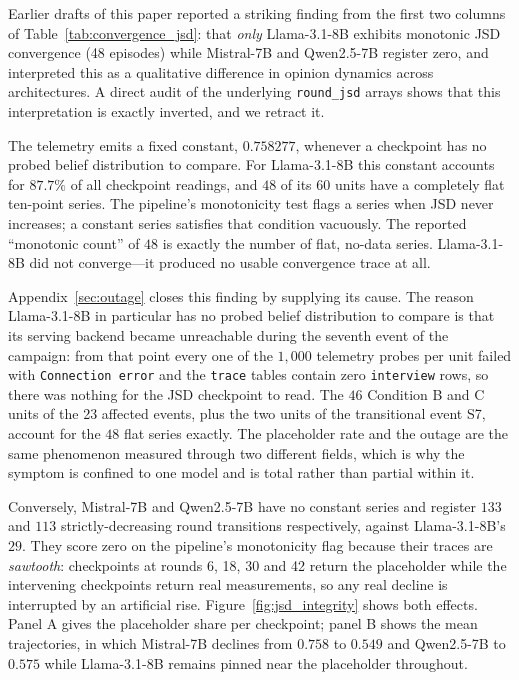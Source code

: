 \documentclass[11pt,journal,onecolumn]{IEEEtran}
\begin{document}
Earlier drafts of this paper reported a striking finding from the first two columns of Table~\ref{tab:convergence_jsd}: that \emph{only} Llama-3.1-8B exhibits monotonic JSD convergence (48 episodes) while Mistral-7B and Qwen2.5-7B register zero, and interpreted this as a qualitative difference in opinion dynamics across architectures. A direct audit of the underlying \texttt{round\_jsd} arrays shows that this interpretation is exactly inverted, and we retract it.

The telemetry emits a fixed constant, $0.758277$, whenever a checkpoint has no probed belief distribution to compare. For Llama-3.1-8B this constant accounts for $87.7\%$ of all checkpoint readings, and $48$ of its $60$ units have a completely flat ten-point series. The pipeline's monotonicity test flags a series when JSD never increases; a constant series satisfies that condition vacuously. The reported ``monotonic count'' of $48$ is exactly the number of flat, no-data series. Llama-3.1-8B did not converge---it produced no usable convergence trace at all.

Appendix~\ref{sec:outage} closes this finding by supplying its cause. The reason Llama-3.1-8B in particular has no probed belief distribution to compare is that its serving backend became unreachable during the seventh event of the campaign: from that point every one of the $1{,}000$ telemetry probes per unit failed with \texttt{Connection error} and the \texttt{trace} tables contain zero \texttt{interview} rows, so there was nothing for the JSD checkpoint to read. The $46$ Condition B and C units of the 23 affected events, plus the two units of the transitional event S7, account for the $48$ flat series exactly. The placeholder rate and the outage are the same phenomenon measured through two different fields, which is why the symptom is confined to one model and is total rather than partial within it.

Conversely, Mistral-7B and Qwen2.5-7B have no constant series and register $133$ and $113$ strictly-decreasing round transitions respectively, against Llama-3.1-8B's $29$. They score zero on the pipeline's monotonicity flag because their traces are \emph{sawtooth}: checkpoints at rounds 6, 18, 30 and 42 return the placeholder while the intervening checkpoints return real measurements, so any real decline is interrupted by an artificial rise. Figure~\ref{fig:jsd_integrity} shows both effects. Panel A gives the placeholder share per checkpoint; panel B shows the mean trajectories, in which Mistral-7B declines from $0.758$ to $0.549$ and Qwen2.5-7B to $0.575$ while Llama-3.1-8B remains pinned near the placeholder throughout.
\end{document}
